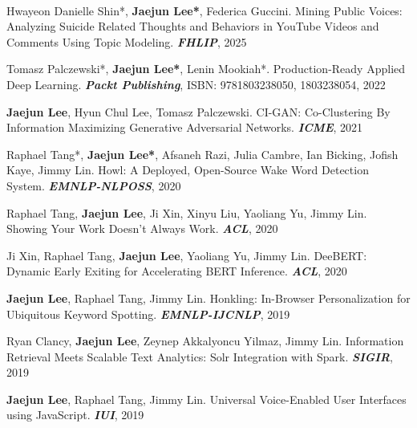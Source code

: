 
\vspace*{-0.40cm}
\hfill {}\vspace*{-0.30cm}

\vspace*{-0.15cm}
\\
\begin{cvenumerate}[1]
\item {Hwayeon Danielle Shin*, \textcolor{gray!99!black}{\textbf{Jaejun Lee*}}, Federica Guccini. Mining Public Voices: Analyzing Suicide Related Thoughts and Behaviors in YouTube Videos and Comments Using Topic Modeling. \textbf{\textit{FHLIP}}, 2025}
\item {Tomasz Palczewski*, \textcolor{gray!99!black}{\textbf{Jaejun Lee*}}, Lenin Mookiah*. Production-Ready Applied Deep Learning. \textbf{\textit{Packt Publishing}}, ISBN: 9781803238050, 1803238054, 2022}
\item \hypertarget{CI-GAN:ICME}{\textcolor{gray!99!black}{\textbf{Jaejun Lee}}, Hyun Chul Lee, Tomasz Palczewski. CI-GAN: Co-Clustering By Information Maximizing Generative Adversarial Networks. \textbf{\textit{ICME}}, 2021}
\item \hypertarget{howl:EMNLP}{Raphael Tang*, \textcolor{gray!99!black}{\textbf{Jaejun Lee*}}, Afsaneh Razi, Julia Cambre, Ian Bicking, Jofish Kaye, Jimmy Lin. Howl: A Deployed, Open-Source Wake Word Detection System. \textbf{\textit{EMNLP-NLPOSS}}, 2020}
\item \hypertarget{show:ACL}{Raphael Tang, \textcolor{gray!99!black}{\textbf{Jaejun Lee}}, Ji Xin, Xinyu Liu, Yaoliang Yu, Jimmy Lin. Showing Your Work Doesn't Always Work. \textbf{\textit{ACL}}, 2020}
\item \hypertarget{DeeBERT:ACL}{Ji Xin, Raphael Tang, \textcolor{gray!99!black}{\textbf{Jaejun Lee}}, Yaoliang Yu, Jimmy Lin. DeeBERT: Dynamic Early Exiting for Accelerating BERT Inference. \textbf{\textit{ACL}}, 2020}
\newpage
\item \hypertarget{honkling:EMNLP}{\textcolor{gray!99!black}{\textbf{Jaejun Lee}}, Raphael Tang, Jimmy Lin. Honkling: In-Browser Personalization for Ubiquitous Keyword Spotting. \textbf{\textit{EMNLP-IJCNLP}}, 2019}
\item {Ryan Clancy, \textcolor{gray!99!black}{\textbf{Jaejun Lee}}, Zeynep Akkalyoncu Yilmaz, Jimmy Lin. Information Retrieval Meets Scalable Text Analytics: Solr Integration with Spark. \textbf{\textit{SIGIR}}, 2019}
\item \hypertarget{honkling:IUI}{\textcolor{gray!99!black}{\textbf{Jaejun Lee}}, Raphael Tang, Jimmy Lin. Universal Voice-Enabled User Interfaces using JavaScript. \textbf{\textit{IUI}}, 2019}
\end{cvenumerate}
